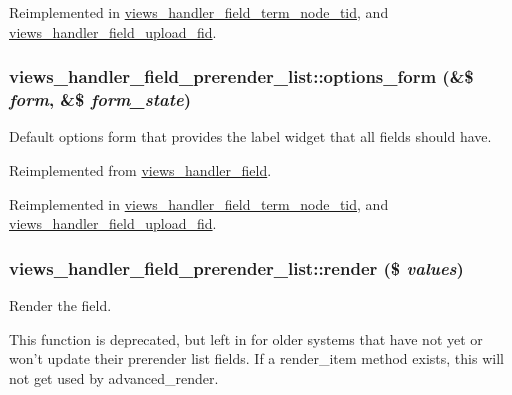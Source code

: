 Reimplemented in \hyperlink{classviews__handler__field__term__node__tid_6c6e6369b1897f4f6643a609b1a802a5}{views\_\-handler\_\-field\_\-term\_\-node\_\-tid}, and \hyperlink{classviews__handler__field__upload__fid_740ca6ec94e724e23023400ddbeb5978}{views\_\-handler\_\-field\_\-upload\_\-fid}.\hypertarget{classviews__handler__field__prerender__list_6a88df29dbdd11aefc5d108dca6530e0}{
\subsubsection[{options\_\-form}]{\setlength{\rightskip}{0pt plus 5cm}views\_\-handler\_\-field\_\-prerender\_\-list::options\_\-form (\&\$ {\em form}, \/  \&\$ {\em form\_\-state})}}
\label{classviews__handler__field__prerender__list_6a88df29dbdd11aefc5d108dca6530e0}


Default options form that provides the label widget that all fields should have. 

Reimplemented from \hyperlink{classviews__handler__field_0435d161922b7b4b84f02a2e79bb947a}{views\_\-handler\_\-field}.

Reimplemented in \hyperlink{classviews__handler__field__term__node__tid_0f0641c036e0a2498abd497cba1161a5}{views\_\-handler\_\-field\_\-term\_\-node\_\-tid}, and \hyperlink{classviews__handler__field__upload__fid_b39479eb80cfba952037f37e930d1b6e}{views\_\-handler\_\-field\_\-upload\_\-fid}.\hypertarget{classviews__handler__field__prerender__list_e29a9fc47e5a83e9a8eb314dc46e68cf}{
\subsubsection[{render}]{\setlength{\rightskip}{0pt plus 5cm}views\_\-handler\_\-field\_\-prerender\_\-list::render (\$ {\em values})}}
\label{classviews__handler__field__prerender__list_e29a9fc47e5a83e9a8eb314dc46e68cf}


Render the field.

This function is deprecated, but left in for older systems that have not yet or won't update their prerender list fields. If a render\_\-item method exists, this will not get used by advanced\_\-render. 

